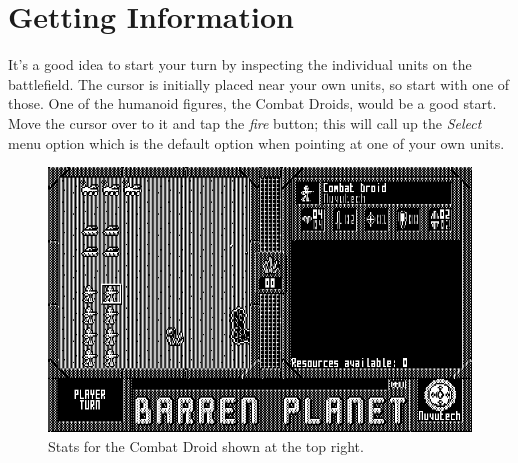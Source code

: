 \section {Getting Information}

\noindent
It's a good idea to start your turn by inspecting the individual units on the battlefield. The cursor is initially placed near your own units, so start with one of those. One of the humanoid figures, the Combat Droids, would be a good start. Move the cursor over to it and tap the {\it fire} button; this will call up the {\it Select} menu option which is the default option when pointing at one of your own units.

\begin{figure}[h]
  \includegraphics[width=\textwidth]{unit-stats}
  \caption{Stats for the Combat Droid shown at the top right.}
\end{figure}

